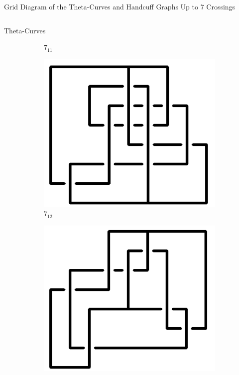 \documentclass[final]{beamer}
\begin{document}
\begin{frame}[t]
\begin{alertblock}{Grid Diagram of the Theta-Curves and Handcuff Graphs Up to 7 Crossings}
\begin{columns}[t]
\begin{column}{0.5\textwidth}
\begin{alertblock}{Theta-Curves}
\begin{figure}
\begin{subfigure}{0.075\textwidth}
    \caption{$7_{11}$} 
    \end{subfigure}
    \begin{subfigure}{0.075\textwidth}
    \includegraphics[width=\columnwidth]{../Midterm_Poster/grid_diagram/theta_7_12.png}
    \caption{$7_{12}$} 
    \end{subfigure}
    \begin{subfigure}{0.075\textwidth}
    \includegraphics[width=\columnwidth]{../Midterm_Poster/grid_diagram/theta_7_13.png}

\end{subfigure}
\end{figure}
\end{alertblock}
\end{column}
\end{columns}
\end{alertblock}
\end{frame}
\end{document}
